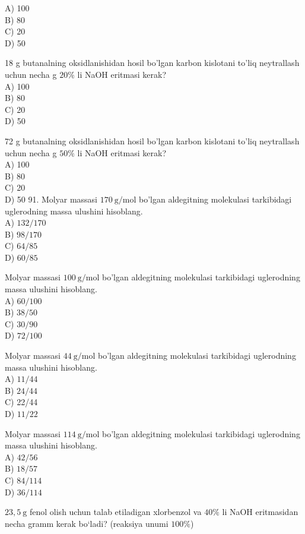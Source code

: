 A) 100\\
B) 80\\
C) 20\\
D) 50
  \item 18 g butanalning oksidlanishidan hosil bo'lgan karbon kislotani to'liq neytrallash uchun necha g $20 \%$ li NaOH eritmasi kerak?\\
A) 100\\
B) 80\\
C) 20\\
D) 50
  \item 72 g butanalning oksidlanishidan hosil bo'lgan karbon kislotani to'liq neytrallash uchun necha g $50 \%$ li NaOH eritmasi kerak?\\
A) 100\\
B) 80\\
C) 20\\
D) 50
91. Molyar massasi $170 \mathrm{~g} / \mathrm{mol}$ bo'lgan aldegitning molekulasi tarkibidagi uglerodning massa ulushini hisoblang.\\
A) $132 / 170$\\
B) $98 / 170$\\
C) $64 / 85$\\
D) $60 / 85$
  \item Molyar massasi $100 \mathrm{~g} / \mathrm{mol}$ bo'lgan aldegitning molekulasi tarkibidagi uglerodning massa ulushini hisoblang.\\
A) $60 / 100$\\
B) $38 / 50$\\
C) $30 / 90$\\
D) $72 / 100$
  \item Molyar massasi $44 \mathrm{~g} / \mathrm{mol}$ bo'lgan aldegitning molekulasi tarkibidagi uglerodning massa ulushini hisoblang.\\
A) $11 / 44$\\
B) $24 / 44$\\
C) 22/44\\
D) $11 / 22$
  \item Molyar massasi $114 \mathrm{~g} / \mathrm{mol}$ bo'lgan aldegitning molekulasi tarkibidagi uglerodning massa ulushini hisoblang.\\
A) $42 / 56$\\
B) $18 / 57$\\
C) $84 / 114$\\
D) $36 / 114$
\item $23{,}5~\mathrm{g}$ fenol olish uchun talab etiladigan xlorbenzol va $40\%$ li NaOH eritmasidan necha gramm kerak bo‘ladi? (reaksiya unumi $100\%$)\\
